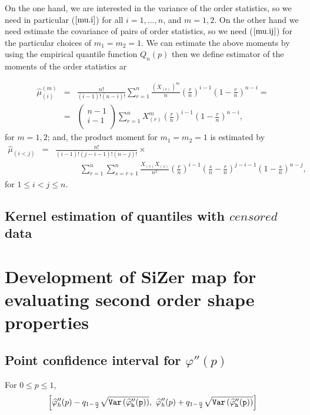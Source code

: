 \documentclass[preprint,12pt]{elsarticle}
\begin{document}
On the one hand, we are interested in the variance of the order statistics, so we need in particular ($\ref{mu.i}$) for all $i=1,\ldots,n$, and $m=1,2$. On the other hand we need estimate the covariance of pairs of order statistics, so we need ($\ref{mu.ij}$) for the particular choices of $m_1=m_2=1$. We can estimate the above moments by using the empirical quantile function $Q_n(p)$ then we define estimator of the moments of the order statistics ar

\begin{eqnarray}\label{hat.mu.i}
\widehat{\mu}_{(i)}^{(m)}&=&\frac{n!}{(i-1)!(n-i)!}\sum_{r=1}^n \frac{\left(X_{(r)}\right)^m}{n} \left(\frac{r}{n}\right)^{i-1}\left(1-\frac{r}{n}\right)^{n-i}= \\
\nonumber &=&\left(\begin{array}{c} n-1 \\ i-1 \\ \end{array}\right)\sum_{r=1}^n X_{(r)}^m \left(\frac{r}{n}\right)^{i-1}\left(1-\frac{r}{n}\right)^{n-i},
\end{eqnarray}
for $m=1,2$; and, the product moment for $m_1=m_2=1$ is estimated by
\begin{eqnarray}\label{hat.mu.ij} 
\widehat{\mu}_{(i<j)}&=&\frac{n!}{(i-1)!(j-i-1)!(n-j)!} \times \\ 
\nonumber && \quad \quad \quad \sum_{r=1}^n\sum_{s=r+1}^n\frac{X_{(r)}X_{(s)}}{n^2}\left(\frac{r}{n}\right)^{i-1}
                                       \left(\frac{s}{n}-\frac{r}{n}\right)^{j-i-1}\left(1-\frac{s}{n}\right)^{n-j},
\end{eqnarray}
for $1 \leq i<j \leq n$.

\subsection{Kernel estimation of quantiles with $censored$ data}

\section{Development of SiZer map for evaluating second order shape properties}

\subsection*{Point confidence interval for $\varphi''(p)$}
For $0\leq p \leq 1$,
\[
\left[\widehat{\varphi}''_h(p)-q_{1-\frac{\alpha}{2}}\sqrt{\tt{Var}\left(\widehat{\varphi}''_h(p)\right)}, \ \widehat{\varphi}''_h(p)+q_{1-\frac{\alpha}{2}}\sqrt{\tt{Var}\left(\widehat{\varphi}''_h(p)\right)}\right]
\]
\end{document}
